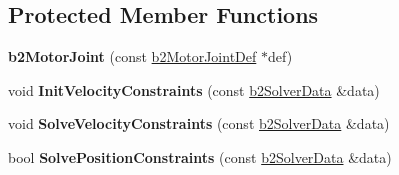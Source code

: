 \subsection*{Protected Member Functions}
\begin{DoxyCompactItemize}
\item 
{\bfseries b2\+Motor\+Joint} (const \hyperlink{structb2_motor_joint_def}{b2\+Motor\+Joint\+Def} $\ast$def)\hypertarget{classb2_motor_joint_ac0c56b069910915e1ceef3b89c035833}{}\label{classb2_motor_joint_ac0c56b069910915e1ceef3b89c035833}

\item 
void {\bfseries Init\+Velocity\+Constraints} (const \hyperlink{structb2_solver_data}{b2\+Solver\+Data} \&data)\hypertarget{classb2_motor_joint_a49d04e78d28f21491a93d1946f584da2}{}\label{classb2_motor_joint_a49d04e78d28f21491a93d1946f584da2}

\item 
void {\bfseries Solve\+Velocity\+Constraints} (const \hyperlink{structb2_solver_data}{b2\+Solver\+Data} \&data)\hypertarget{classb2_motor_joint_a06a8ccfab3121daa119d548cbb19593c}{}\label{classb2_motor_joint_a06a8ccfab3121daa119d548cbb19593c}

\item 
bool {\bfseries Solve\+Position\+Constraints} (const \hyperlink{structb2_solver_data}{b2\+Solver\+Data} \&data)\hypertarget{classb2_motor_joint_a78b06e3e03eb211f85504f2d9ef66863}{}\label{classb2_motor_joint_a78b06e3e03eb211f85504f2d9ef66863}

\end{DoxyCompactItemize}
